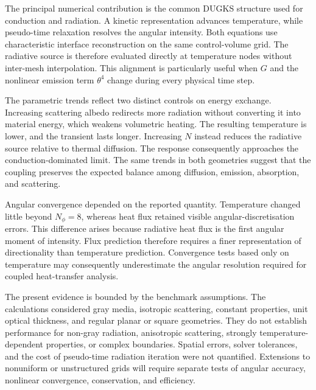 \documentclass[a4paper,12pt]{ctexart}
\numberwithin{equation}{section}
\begin{document}
The principal numerical contribution is the common DUGKS structure used for conduction and radiation. A kinetic representation advances temperature, while pseudo-time relaxation resolves the angular intensity. Both equations use characteristic interface reconstruction on the same control-volume grid. The radiative source is therefore evaluated directly at temperature nodes without inter-mesh interpolation. This alignment is particularly useful when $G$ and the nonlinear emission term $\theta^4$ change during every physical time step.

The parametric trends reflect two distinct controls on energy exchange. Increasing scattering albedo redirects more radiation without converting it into material energy, which weakens volumetric heating. The resulting temperature is lower, and the transient lasts longer. Increasing $N$ instead reduces the radiative source relative to thermal diffusion. The response consequently approaches the conduction-dominated limit. The same trends in both geometries suggest that the coupling preserves the expected balance among diffusion, emission, absorption, and scattering.

Angular convergence depended on the reported quantity. Temperature changed little beyond $N_\phi=8$, whereas heat flux retained visible angular-discretisation errors. This difference arises because radiative heat flux is the first angular moment of intensity. Flux prediction therefore requires a finer representation of directionality than temperature prediction. Convergence tests based only on temperature may consequently underestimate the angular resolution required for coupled heat-transfer analysis.

The present evidence is bounded by the benchmark assumptions. The calculations considered gray media, isotropic scattering, constant properties, unit optical thickness, and regular planar or square geometries. They do not establish performance for non-gray radiation, anisotropic scattering, strongly temperature-dependent properties, or complex boundaries. Spatial errors, solver tolerances, and the cost of pseudo-time radiation iteration were not quantified. Extensions to nonuniform or unstructured grids will require separate tests of angular accuracy, nonlinear convergence, conservation, and efficiency.



\end{document}
